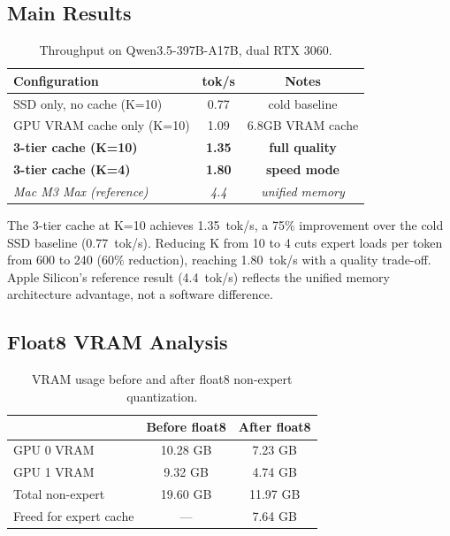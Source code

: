 \documentclass[conference]{IEEEtran}
\begin{document}
\subsection{Main Results}

\begin{table}[t]
\centering
\caption{Throughput on Qwen3.5-397B-A17B, dual RTX 3060.}
\label{tab:main}
\begin{tabular}{lcc}
\toprule
Configuration & tok/s & Notes \\
\midrule
SSD only, no cache (K=10) & 0.77 & cold baseline \\
GPU VRAM cache only (K=10) & 1.09 & 6.8GB VRAM cache \\
\textbf{3-tier cache (K=10)} & \textbf{1.35} & \textbf{full quality} \\
\textbf{3-tier cache (K=4)} & \textbf{1.80} & \textbf{speed mode} \\
\midrule
\textit{Mac M3 Max (reference)} & \textit{4.4} & \textit{unified memory} \\
\bottomrule
\end{tabular}
\end{table}

The 3-tier cache at K=10 achieves 1.35~tok/s, a 75\% improvement over the cold SSD baseline (0.77~tok/s). Reducing K from 10 to 4 cuts expert loads per token from 600 to 240 (60\% reduction), reaching 1.80~tok/s with a quality trade-off. Apple Silicon's reference result (4.4~tok/s) reflects the unified memory architecture advantage, not a software difference.

\subsection{Float8 VRAM Analysis}

\begin{table}[t]
\centering
\caption{VRAM usage before and after float8 non-expert quantization.}
\label{tab:float8}
\begin{tabular}{lcc}
\toprule
& Before float8 & After float8 \\
\midrule
GPU 0 VRAM & 10.28 GB & 7.23 GB \\
GPU 1 VRAM & 9.32 GB & 4.74 GB \\
Total non-expert & 19.60 GB & 11.97 GB \\
Freed for expert cache & --- & 7.64 GB \\
\bottomrule
\end{tabular}
\end{table}
\end{document}
